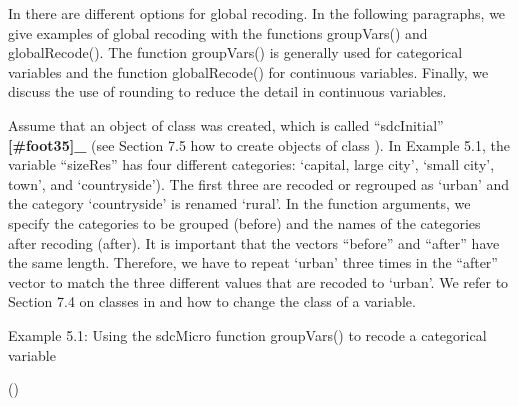 \documentclass[letterpaper,10pt,english]{sphinxmanual}
\begin{document}
In  there are different options for global recoding. In the
following paragraphs, we give examples of global recoding with the
functions groupVars() and globalRecode(). The function groupVars() is
generally used for categorical variables and the function globalRecode()
for continuous variables. Finally, we discuss the use of rounding to
reduce the detail in continuous variables.


Assume that an object of class  was created, which is called
“sdcInitial” {\color{red}\bfseries{}{[}\#foot35{]}\_} (see Section 7.5 how to create
objects of class ). In Example 5.1, the variable “sizeRes” has
four different categories: ‘capital, large city’, ‘small city’, town’,
and ‘countryside’). The first three are recoded or regrouped as ‘urban’
and the category ‘countryside’ is renamed ‘rural’. In the function
arguments, we specify the categories to be grouped (before) and the
names of the categories after recoding (after). It is important that the
vectors “before” and “after” have the same length. Therefore, we have to
repeat ‘urban’ three times in the “after” vector to match the three
different values that are recoded to ‘urban’.  We refer to
Section 7.4 on classes in  and how to change the class of a variable.

Example 5.1: Using the sdcMicro function groupVars() to recode a
categorical variable

\begin{DUlineblock}{0em}
\item[] 
\item[] ()
\item[] 
\item[] 
\end{DUlineblock}
\end{document}
